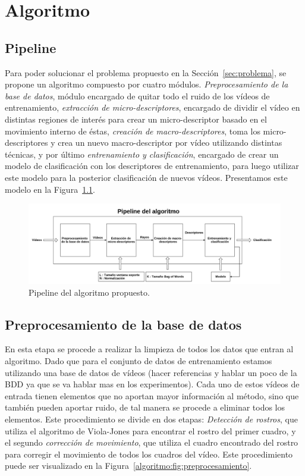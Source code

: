 \chapter[Algoritmo]{Algoritmo}
\label{ch:algoritmo}
\section{Pipeline}
\label{sec:pipeline}
Para poder solucionar el problema propuesto en la Sección~\ref{sec:problema}, se propone un algoritmo compuesto por cuatro módulos. \emph{Preprocesamiento de la base de datos}, módulo encargado de quitar todo el ruido de los vídeos de entrenamiento, \emph{extracción de micro-descriptores}, encargado de dividir el vídeo en distintas regiones de interés para crear un micro-descriptor basado en el movimiento interno de éstas, \emph{creación de macro-descriptores}, toma los micro-descriptores y crea un nuevo macro-descriptor por vídeo utilizando distintas técnicas, y por último \emph{entrenamiento y clasificación}, encargado de crear un modelo de clasificación con los descriptores de entrenamiento, para luego utilizar este modelo para la posterior clasificación de nuevos vídeos. Presentamos este modelo en la Figura~\ref{algoritmo:fig:pipeline}.

	\begin{figure}[bt]
		\centering
    		\includegraphics[width=1\textwidth]{Figuras/Diagramas/pipeline.png}
  		\caption{Pipeline del algoritmo propuesto.}
  		\label{algoritmo:fig:pipeline}
	\end{figure}	


\section{Preprocesamiento de la base de datos}
\label{sec:proc_bdd}
	En esta etapa se procede a realizar la limpieza de todos los datos que entran al algoritmo. Dado que para el conjunto de datos de entrenamiento estamos utilizando una base de datos de vídeos (hacer referencias y hablar un poco de la BDD ya que se va hablar mas en los experimentos). Cada uno de estos vídeos de entrada tienen elementos que no aportan mayor información al método, sino que también pueden aportar ruido, de tal manera se procede a eliminar todos los elementos. Este procedimiento se divide en dos etapas: \emph{Detección de rostros}, que utiliza el algoritmo de Viola-Jones para encontrar el rostro del primer cuadro, y el segundo \emph{corrección de movimiento}, que utiliza el cuadro encontrado del rostro para corregir el movimiento de todos los cuadros del vídeo. Este procedimiento puede ser visualizado en la Figura~\ref{algoritmo:fig:preprocesamiento}. 
	
